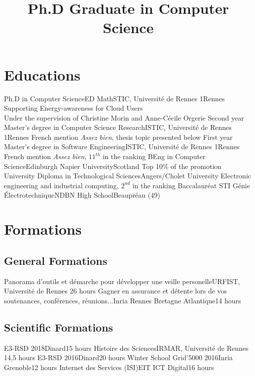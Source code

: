 \documentclass[11pt,a4paper]{moderncv}
\title{Ph.D Graduate in Computer Science}
\begin{document}
\makecvtitle

\section{Educations}
  {Ph.D in Computer Science}{ED MathSTIC, Université de Rennes 1}{Rennes}{}
	{Supporting Energy-awareness for Cloud Users\\Under the supervision of Christine Morin and Anne-Cécile Orgerie}
  {Second year Master’s degree in Computer Science Research}{ISTIC, Université de Rennes 1}{Rennes}{}
  {French mention \textit{Assez bien}, thesis topic presented below}
  {First year Master’s degree in Software Engineering}{ISTIC, Université de Rennes 1}{Rennes}{}
  {French mention \textit{Assez bien}, $11^{th}$ in the ranking}
  {BEng in Computer Science}{Edinburgh Napier University}{Scotland}{}
  {Top 10\% of the promotion}
  {University Diploma in Technological Sciences}{Angers/Cholet University}{}{}
	{Electronic engineering and industrial computing, $2^{nd}$ in the ranking}
  {Baccalauréat STI Génie Électrotechnique}{NDBN High School}{Beaupréau (49)}{}{}

\section{Formations}

\subsection{General Formations}
  {Panorama d'outils et démarche pour développer une veille personelle}{URFIST, Université de Rennes 2}{6 hours}{}{}
  {Gagner en assurance et détente lors de vos soutenances, conférences, réunions...}{Inria Rennes Bretagne Atlantique}{14 hours}{}{}

\subsection{Scientific Formations}
  {E3-RSD 2018}{Dinard}{15 hours}{}{}
  {Histoire des Sciences}{IRMAR, Université de Rennes 1}{4,5 hours}{}{}
  {E3-RSD 2016}{Dinard}{20 hours}{}{}
  {Winter School Grid'5000 2016}{Inria Grenoble}{12 hours}{}{}
  {Internet des Services (ISI)}{EIT ICT Digital}{16 hours}{}{}
\end{document}
